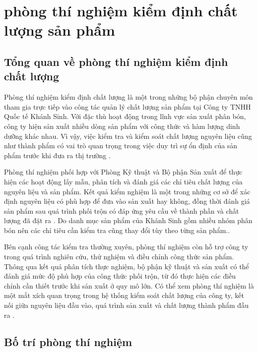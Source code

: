 \chapter{phòng thí nghiệm kiểm định chất lượng sản phẩm}
\section{Tổng quan về phòng thí nghiệm kiểm định chất lượng}
Phòng thí nghiệm kiểm định chất lượng là một trong những bộ phận chuyên môn tham gia trực tiếp vào công tác quản lý chất lượng sản phẩm tại Công ty TNHH Quốc tế Khánh Sinh. 
Với đặc thù hoạt động trong lĩnh vực sản xuất phân bón, công ty hiện sản xuất nhiều dòng sản phẩm với công thức và hàm lượng dinh dưỡng khác nhau. 
Vì vậy, việc kiểm tra và kiểm soát chất lượng nguyên liệu cũng như thành phẩm có vai trò quan trọng trong việc duy trì sự ổn định của sản phẩm trước khi đưa ra thị trường \cite{company-internal-documents}.

Phòng thí nghiệm phối hợp với Phòng Kỹ thuật và Bộ phận Sản xuất để thực hiện các hoạt động lấy mẫu, phân tích và đánh giá các chỉ tiêu chất lượng của nguyên liệu và sản phẩm. 
Kết quả kiểm nghiệm là một trong những cơ sở để xác định nguyên liệu có phù hợp để đưa vào sản xuất hay không, đồng thời đánh giá sản phẩm sau quá trình phối trộn có đáp ứng yêu cầu về thành phần và chất lượng đã đặt ra \cite{company-internal-documents}.
Do danh mục sản phẩm của Khánh Sinh gồm nhiều nhóm phân bón nên các chỉ tiêu cần kiểm tra cũng thay đổi tùy theo từng sản phẩm.\cite{company-internal-documents}.

Bên cạnh công tác kiểm tra thường xuyên, phòng thí nghiệm còn hỗ trợ công ty trong quá trình nghiên cứu, thử nghiệm và điều chỉnh công thức sản phẩm. 
Thông qua kết quả phân tích thực nghiệm, bộ phận kỹ thuật và sản xuất có thể đánh giá mức độ phù hợp của công thức phối trộn, từ đó thực hiện các điều chỉnh cần thiết trước khi sản xuất ở quy mô lớn. 
Có thể xem phòng thí nghiệm là một mắt xích quan trọng trong hệ thống kiểm soát chất lượng của công ty, kết nối giữa nguyên liệu đầu vào, quá trình sản xuất và chất lượng thành phẩm đầu ra \cite{company-internal-documents}.

\section{Bố trí phòng thí nghiệm}

